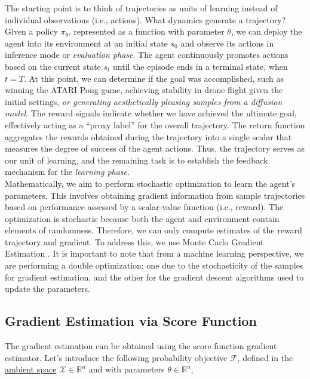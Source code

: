 The starting point is to think of trajectories as units of learning instead of individual observations (i.e., actions). What dynamics generate a trajectory? 
Given a policy $\pi_{\theta}$, represented as a function with parameter $\theta$, we can deploy the agent into its environment at an initial state $s_0$ and observe its actions in inference mode or \textit{evaluation phase}. The agent continuously promotes actions based on the current state $s_{t}$
until the episode ends in a terminal state, when $t=T$. At this point, we can determine if the goal was accomplished, such as winning the ATARI Pong game, achieving stability in drone flight given the initial settings, \textit{or generating aesthetically pleasing samples from a diffusion model}. The reward signals indicate whether we have achieved the ultimate goal, effectively acting as a ``proxy label'' for the overall trajectory. The return function aggregates the rewards obtained during the trajectory into a single scalar that measures the degree of success of the agent actions. Thus, the trajectory serves as our unit of learning, and the remaining task is to establish the feedback mechanism for the \textit{learning phase}. \\

\noindent Mathematically, we aim to perform stochastic optimization to learn the agent’s parameters. This involves obtaining gradient information from sample trajectories based on performance assessed by a scalar-value function (i.e., reward). The optimization is stochastic because both the agent and environment contain elements of randomness. Therefore, we can only compute estimates of the reward trajectory and gradient. To address this, we use Monte Carlo Gradient Estimation \citep{mohamed2020monte}. It is important to note that from a machine learning perspective, we are performing a double optimization: one due to the stochasticity of the samples for gradient estimation, and the other for the gradient descent algorithms used to update the parameters.

\subsection{Gradient Estimation via Score Function}

The gradient estimation can be obtained using the score function gradient estimator. Let's introduce the following probability objective $\mathcal{F}$, defined in the \href{https://en.wikipedia.org/wiki/Ambient_space_(mathematics)}{ambient space} $\mathcal{X}\in\mathbb{R}^n$ and with parameters $\theta\in\mathbb{R}^n$,

